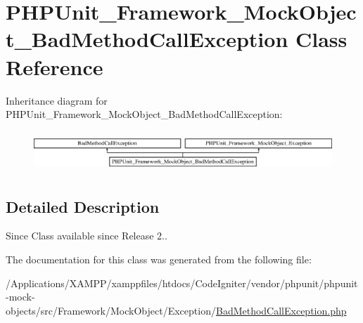 \hypertarget{class_p_h_p_unit___framework___mock_object___bad_method_call_exception}{}\section{P\+H\+P\+Unit\+\_\+\+Framework\+\_\+\+Mock\+Object\+\_\+\+Bad\+Method\+Call\+Exception Class Reference}
\label{class_p_h_p_unit___framework___mock_object___bad_method_call_exception}
Inheritance diagram for P\+H\+P\+Unit\+\_\+\+Framework\+\_\+\+Mock\+Object\+\_\+\+Bad\+Method\+Call\+Exception\+:\begin{figure}[H]
\begin{center}
\leavevmode
\includegraphics[height=1.559888cm]{class_p_h_p_unit___framework___mock_object___bad_method_call_exception}
\end{center}
\end{figure}


\subsection{Detailed Description}
\begin{DoxySince}{Since}
Class available since Release 2.. 
\end{DoxySince}


The documentation for this class was generated from the following file\+:\begin{DoxyCompactItemize}
\item 
/\+Applications/\+X\+A\+M\+P\+P/xamppfiles/htdocs/\+Code\+Igniter/vendor/phpunit/phpunit-\/mock-\/objects/src/\+Framework/\+Mock\+Object/\+Exception/\mbox{\hyperlink{_bad_method_call_exception_8php}{Bad\+Method\+Call\+Exception.\+php}}\end{DoxyCompactItemize}
